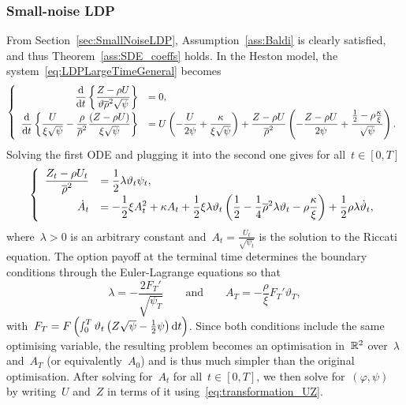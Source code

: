 \subsubsection{Small-noise LDP}
From Section~\ref{sec:SmallNoiseLDP},
Assumption~\ref{ass:Baldi} is clearly satisfied, 
and thus Theorem~\ref{ass:SDE_coeffs} holds.
In the Heston model, the system~\eqref{eq:LDPLargeTimeGeneral} becomes
\begin{equation*}
\left\{
\begin{array}{rl}
\displaystyle \frac{\mathrm{d}}{\mathrm{d} t}\left\{\frac{Z - \rho U}{\vartheta\overline{\rho}^2\sqrt{\psi}}\right\} &= 0,\\
\displaystyle \frac{\mathrm{d}}{\mathrm{d} t}\left\{
\frac{U}{\xi \sqrt{\psi}} - \frac{\rho}{\overline{\rho}^2}\frac{(Z - \rho U)}{\xi\sqrt{\psi}} \right\}
&= \displaystyle U\left(-\frac{U}{2\psi} + \frac{\kappa}{\xi \sqrt{\psi}}\right)
+ \frac{Z - \rho U}{\overline{\rho}^2}\left(-\frac{Z-\rho U}{2\psi} + \frac{\frac{1}{2} - \rho \frac{\kappa}{\xi}}{\sqrt{\psi}}\right).
\end{array}
\right.
\end{equation*}
Solving the first ODE and plugging it into the second one gives for all~$t\in[0, T]$
\begin{equation}\label{eq:RiccatiA}
\left\{
\begin{array}{rl}
\displaystyle \frac{Z_t - \rho U_t}{\overline{\rho}^2}
&= \displaystyle \frac{1}{2} \lambda \vartheta_t \psi_t,\\
\displaystyle \dot{A}_t &= 
\displaystyle -\frac{1}{2}\xi A_t^2 + \kappa A_t + \frac{1}{2}\xi \lambda \vartheta_t \left(\frac{1}{2} - \frac{1}{4}\overline{\rho}^2\lambda\vartheta_t - \rho\frac{\kappa}{\xi} \right) + \frac{1}{2}\rho\lambda\dot{\vartheta}_t,
\end{array}
\right.
\end{equation}
where~$\lambda>0$ is an arbitrary constant and~$A_t = \frac{U_t}{\sqrt{\psi_t}}$ is the solution to the Riccati equation. The option payoff at the terminal time determines the boundary conditions through the Euler-Lagrange equations so that
\[
\lambda = - \frac{2F_T'}{\sqrt{\psi_T}} 
\qquad \text{and} \qquad 
A_T = -\frac{\rho}{\xi}F_T'\vartheta_T,
\]
with~$F_T=F\left(\smallint_0^T\vartheta_t\left(Z\sqrt\psi-\frac12\psi\right) \mathrm{d} t\right)$. 
Since both conditions include the same optimising variable, 
the resulting problem becomes an optimisation in~$\mathbb{R}^2$ over~$\lambda$ and~$A_T$ (or equivalently~$A_0$) and is thus much simpler than the original optimisation. 
After solving for~$A_t$ for all~$t\in[0, T]$, we then solve for~$(\varphi,\psi)$ by writing~$U$ and~$Z$ in terms of it using~\eqref{eq:transformation_UZ}. 

